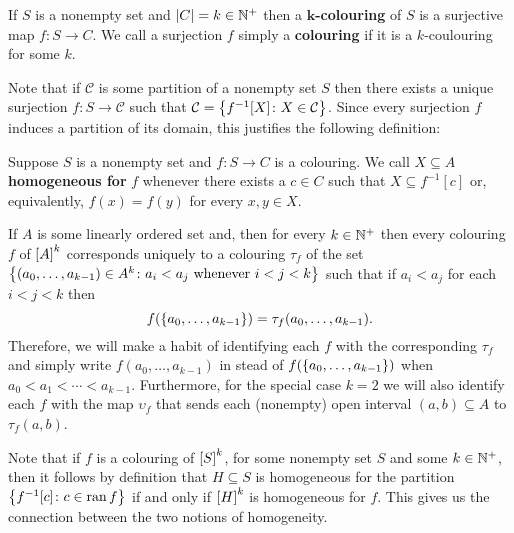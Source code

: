 \begin{dfn}[Colouring]\label{def:Col}
	If $S$ is a nonempty set and $\card{C}=k\in\posnats$ then a $\mathbf{k}$\textbf{-colouring} of $S$ is a surjective map $f\colon  S\to C$.  We call a surjection $f$ simply a \textbf{colouring} if it is a $k$-coulouring for some $k$.
\end{dfn}

Note that if $\mathcal{C}$ is some partition of a nonempty set $S$ then there exists a unique surjection $f\colon S\to \mathcal{C}$ such that $\mathcal{C}=\setbuild{f^{-1}[X]}{X\in \mathcal{C}}$. Since every surjection $f$ induces a partition of its domain, this justifies the following definition:

\begin{dfn}
	Suppose $S$ is a nonempty set and $f\colon S\to C$ is a colouring.  We call $X\subseteq A$ \textbf{homogeneous for} $f$ whenever there exists a $c\in C$ such that $X\subseteq f^{-1}[c]$ or, equivalently, $f(x)=f(y)$ for every $x,y\in X$.
\end{dfn}

\begin{rem}\label{rem:Col}
	If $A$ is some linearly ordered set and, then for every $k\in\posnats$ then every colouring $f$ of $\subsets{k}{A}$ corresponds uniquely to a colouring $\tau_f$ of the set $\setbuild{(a_0,\dotsc,a_{k-1})\in A^k}{a_i<a_j\text{ whenever }i<j<k}$ such that if $a_i<a_j$ for each $i<j<k$ then
	\begin{equation}
		f(\set{a_0,\dotsc,a_{k-1}})=\tau_f(a_0,\dotsc,a_{k-1}).
	\end{equation}
	Therefore, we will make a habit of identifying each $f$ with the corresponding $\tau_f$ and simply write $f(a_0,\dotsc,a_{k-1})$ in stead of $f(\set{a_0,\dotsc,a_{k-1}})$ when $a_0<a_1<\dotsb<a_{k-1}$.  Furthermore, for the special case $k=2$ we will also identify each $f$ with the map $\upsilon_f$ that sends each (nonempty) open interval $(a,b)\subseteq A$ to $\tau_f(a,b)$.
\end{rem}

\begin{rem}
	Note that if $f$ is a colouring of $\subsets{k}{S}$, for some nonempty set $S$ and some $k\in\posnats$, then it follows by definition that $H\subseteq S$ is homogeneous for the partition $\setbuild{f^{-1}[c]}{c\in\range f}$ if and only if $\subsets{k}{H}$ is homogeneous for $f$.  This gives us the connection between the two notions of homogeneity.
\end{rem}


